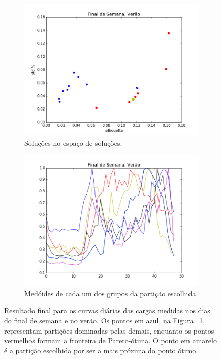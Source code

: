 \begin{figure}
	\centering
	\begin{subfigure}{.5\textwidth}
		\centering
		\includegraphics[width=.9\linewidth]{figuras/australia_5000/pareto_Final_de_Semana_Verao.png}
		\caption{Soluções no espaço de soluções.}
		\label{fig:pareto_FDS_verao}
	\end{subfigure}%
	\begin{subfigure}{.5\textwidth}
		\centering
		\includegraphics[width=.9\linewidth]{figuras/australia_5000/Final_de_Semana_Verao.png}
		\caption{Medóides de cada um dos grupos da partição escolhida.}
		\label{fig:FDS_verao}
	\end{subfigure}
	\caption{Resultado final para os curvas diárias das cargas medidas nos dias do final de semana e no verão. Os pontos em azul, na Figura ~\ref{fig:pareto_FDS_verao}, representam partições dominadas pelas demais, enquanto os pontos vermelhos formam a fronteira de Pareto-ótima. O ponto em amarelo é a partição escolhida por ser a mais próxima do ponto ótimo.}
	\label{fig:FDS_verao_}
\end{figure}
